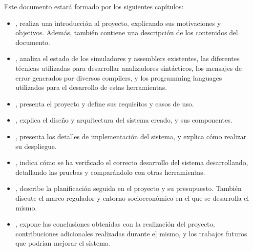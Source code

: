 Este documento estará formado por los siguientes capítulos:

\begin{itemize}
    \item {}, realiza una introducción al proyecto,
    explicando sus motivaciones y objetivos. Además, también contiene una
    descripción de los contenidos del documento.
    \item {}, analiza el estado de los simuladores y
    \glspl{assembler} existentes, las diferentes técnicas utilizadas para
    desarrollar analizadores sintácticos, los mensajes de error generados por
    diversos \glspl{compiler}, y los \glspl{programming language} utilizados
    para el desarrollo de estas herramientas.
    \item {}, presenta el proyecto y define sus requisitos y
    casos de uso.
    \item {}, explica el diseño y arquitectura del sistema
    creado, y sus componentes.
    \item {}, presenta los detalles de implementación
    del sistema, y explica cómo realizar su despliegue.
    \item {}, indica cómo se ha verificado el correcto
    desarrollo del sistema desarrollando, detallando las pruebas y comparándolo
    con otras herramientas.
    \item {}, describe la planificación seguida en el
    proyecto y su presupuesto. También discute el marco regulador y entorno
    socioeconómico en el que se desarrolla el mismo.
    \item {}, expone las conclusiones obtenidas con la
    realización del proyecto, contribuciones adicionales realizadas durante el
    mismo, y los trabajos futuros que podrían mejorar el sistema.
\end{itemize}
